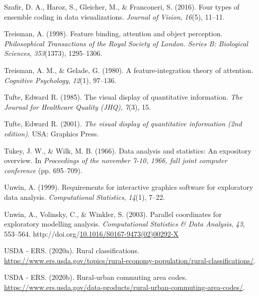 \documentclass[print]{nuthesis}
\newlength{\cslhangindent}
\newenvironment{CSLReferences}[2]%
{\setlength{\parindent}{0pt}%
\everypar{\setlength{\hangindent}{\cslhangindent}}\ignorespaces}%
{\par}
\begin{document}
\begin{CSLReferences}{1}{0}
\leavevmode{}%
Szafir, D. A., Haroz, S., Gleicher, M., \& Franconeri, S. (2016). Four types of ensemble coding in data visualizations. \emph{Journal of Vision}, \emph{16}(5), 11--11.

\leavevmode{}%
Treisman, A. (1998). Feature binding, attention and object perception. \emph{Philosophical Transactions of the Royal Society of London. Series B: Biological Sciences}, \emph{353}(1373), 1295--1306.

\leavevmode{}%
Treisman, A. M., \& Gelade, G. (1980). A feature-integration theory of attention. \emph{Cognitive Psychology}, \emph{12}(1), 97--136.

\leavevmode{}%
Tufte, Edward R. (1985). The visual display of quantitative information. \emph{The Journal for Healthcare Quality (JHQ)}, \emph{7}(3), 15.

\leavevmode{}%
Tufte, Edward R. (2001). \emph{The visual display of quantitative information (2nd edition)}. USA: Graphics Press.

\leavevmode{}%
Tukey, J. W., \& Wilk, M. B. (1966). Data analysis and statistics: An expository overview. In \emph{Proceedings of the november 7-10, 1966, fall joint computer conference} (pp. 695--709).

\leavevmode{}%
Unwin, A. (1999). Requirements for interactive graphics software for exploratory data analysis. \emph{Computational Statistics}, \emph{14}(1), 7--22.

\leavevmode{}%
Unwin, A., Volinsky, C., \& Winkler, S. (2003). Parallel coordinates for exploratory modelling analysis. \emph{Computational Statistics \& Data Analysis}, \emph{43}, 553--564. http://doi.org/\href{https://doi.org/10.1016/S0167-9473(02)00292-X}{10.1016/S0167-9473(02)00292-X}

\leavevmode{}%
USDA - ERS. (2020a). Rural classifications. \url{https://www.ers.usda.gov/topics/rural-economy-population/rural-classifications/}.

\leavevmode{}%
USDA - ERS. (2020b). Rural-urban commuting area codes. \url{https://www.ers.usda.gov/data-products/rural-urban-commuting-area-codes/}.


\end{CSLReferences}
\end{document}
